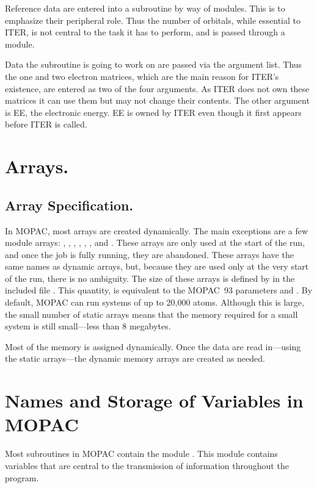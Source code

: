 Reference data are entered into a subroutine by way of modules.
  This is to emphasize their peripheral role.
Thus the number of orbitals, while essential to ITER, is not central to the
task it has  to perform, and is passed through a module.

Data the subroutine is going to work on are passed via the argument list.  Thus
the one and two electron matrices, which are the main reason for ITER's
existence, are entered as two of the four arguments.  As ITER does  not  own
these  matrices it can use them but may not change their contents.  The other
argument is EE, the electronic energy.  EE is owned by ITER even though it
first appears before ITER is called.

\section{Arrays.}
\subsection{Array Specification.}

In MOPAC, most arrays are created dynamically. The main exceptions are a few
module arrays: , , ,  ,
, , and .  These arrays are only used at the start
of the run, and once the job is fully running, they are abandoned.  These
arrays have the same names as dynamic arrays, but, because they are used only
at the very start of the run, there is no ambiguity.   The size of these arrays
is defined by  in the included file .   This
quantity,  is equivalent to the MOPAC~93 parameters  
and .  By default, MOPAC can run systems of up to 20,000 atoms.
Although this is large, the small number of static arrays means that the memory
required for a small system is still small---less than 8  megabytes.

Most of the memory is assigned dynamically.  Once the data are read in---using
the static arrays---the dynamic memory arrays are created as needed.



\section{Names and Storage of Variables in MOPAC}

Most subroutines in MOPAC contain the module
. This module contains variables
that are central to the transmission of information throughout
the program.
%



